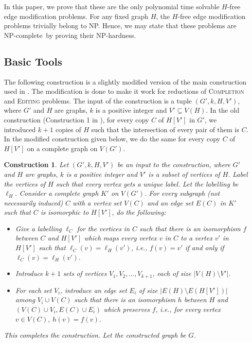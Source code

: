 \documentclass[envcountsame,envcountsect,10pt,oribibl]{llncs}
\newcommand{\cclass}[1]{\textnormal{\textsf{#1}}}
\newcommand{\NP}{\cclass{NP}}
\newcommand{\NPC}{\cclass{NP-complete}}
\newtheorem{construction}{Construction}
\begin{document}
In this paper, we prove that these are the only polynomial time solvable 
$H$-free edge modification problems.
For any fixed graph $H$, the $H$-free edge modification problems trivially belong to \NP. Hence, we may 
state that these problems are \NPC\ by proving their NP-hardness.
\subsection{Basic Tools}

The following construction is a slightly modified version of the main 
construction used in \cite{DBLP:conf/cocoa/AravindSS15}.
The modification is done to make it work for reductions of \textsc{Completion}
and \textsc{Editing} problems. 
The input of the construction is a tuple $(G',k,H,V')$, where $G'$ and $H$ are
graphs, $k$ is a positive integer and $V'\subseteq V(H)$. In the old construction
(Construction 1 in \cite{DBLP:conf/cocoa/AravindSS15}), for every copy $C$ of $H[V']$
in $G'$, we introduced $k+1$ copies of $H$ such that the intersection of every pair
of them is $C$. In the modified construction given below, we do the same for every copy $C$
of $H[V']$ on a complete graph on $V(G')$. 



\begin{construction}
  \label{con:nonadj}
  Let $(G',k, H, V')$ be an input to the construction, where $G'$ and $H$ are graphs, $k$
  is a positive integer and $V'$ is a subset of vertices of $H$.
  Label the vertices of $H$ such that every vertex gets a unique label. Let the labelling be $\ell_H$.
  Consider a complete graph $K'$ on $V(G')$. 
  For every subgraph (not necessarily induced) $C$ with a vertex set $V(C)$ 
  and an edge set $E(C)$ in $K'$ such that $C$ is isomorphic to $H[V']$,
  do the following:
  \begin{itemize}
    \item Give a labelling $\ell_C$ for the vertices in $C$ such that there is an isomorphism
      $f$ between $C$ and $H[V']$ which maps every vertex $v$ in $C$ to a vertex $v'$ in $H[V']$
      such that $\ell_C(v)=\ell_H(v')$, i.e., $f(v)=v'$ if and only if $\ell_C(v)=\ell_H(v')$.
    \item Introduce $k+1$ sets of vertices $V_1, V_2,\ldots, V_{k+1}$, each of size $|V(H)\setminus V'|$.
    \item For each set $V_i$, introduce an edge set $E_i$ of size $|E(H)\setminus E(H[V'])|$ among
      $V_i\cup V(C)$
       such that there is an isomorphism $h$ between $H$ and
      $(V(C)\cup V_i, E(C)\cup E_i)$ which preserves $f$, i.e.,
      for every vertex $v\in V(C)$, $h(v)=f(v)$.
  \end{itemize}
  This completes the construction. Let the constructed graph be $G$. 
\end{construction}
\end{document}
